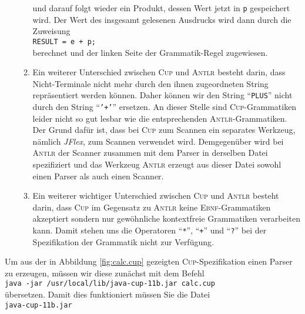 \begin{enumerate}
\begin{enumerate}
            und darauf folgt wieder ein Produkt, dessen Wert jetzt in \texttt{p}
            gespeichert wird.  Der Wert des insgesamt gelesenen Ausdrucks wird dann durch die Zuweisung
            \\[0.2cm]
            \hspace*{1.3cm}
            \texttt{RESULT = e + p;}
            \\[0.2cm]
            berechnet und der linken Seite der Grammatik-Regel zugewiesen.
      \item Ein weiterer Unterschied zwischen \textsc{Cup} und \textsc{Antlr} besteht darin,
            dass Nicht-Terminale nicht mehr durch den ihnen zugeordneten String repr\"asentiert werden
            k\"onnen.  Daher k\"onnen wir den String ``\texttt{PLUS}'' nicht durch den String
            ``\texttt{'+'}'' ersetzen.  
            An dieser Stelle sind \textsc{Cup}-Grammatiken leider nicht so gut lesbar wie die
            entsprechenden \textsc{Antlr}-Grammatiken.
            Der Grund daf\"ur ist, dass bei  \textsc{Cup} zum Scannen ein separates
            Werkzeug, n\"amlich \textsl{JFlex}, zum Scannen verwendet wird.  Demgegen\"uber
            wird bei \textsc{Antlr} der Scanner zusammen mit dem Parser in derselben
            Datei spezifiziert und das Werkzeug \textsc{Antlr} erzeugt aus dieser Datei
            sowohl einen Parser als auch einen Scanner.
      \item Ein weiterer wichtiger Unterschied zwischen \textsc{Cup} und \textsc{Antlr} besteht
            darin, dass \textsc{Cup} im Gegensatz zu \textsc{Antlr} keine \textsc{Ebnf}-Grammatiken
            akzeptiert sondern nur gew\"ohnliche kontextfreie Grammatiken verarbeiten kann.  Damit stehen
            uns die Operatoren ``\texttt{*}'', ``\texttt{+}'' und ``\texttt{?}'' bei der
            Spezifikation der Grammatik nicht zur Verf\"ugung.
      \end{enumerate}
\end{enumerate}
Um aus der in Abbildung \ref{fig:calc.cup} gezeigten \textsc{Cup}-Spezifikation einen Parser zu
erzeugen, m\"ussen wir diese zun\"achst mit dem Befehl
\\[0.2cm]
\hspace*{1.3cm}
\texttt{java -jar /usr/local/lib/java-cup-11b.jar calc.cup}
\\[0.2cm]
\"ubersetzen.  Damit dies funktioniert m\"ussen Sie die Datei
\\[0.2cm]
\hspace*{1.3cm}
 \texttt{java-cup-11b.jar} 
\\[0.2cm]
